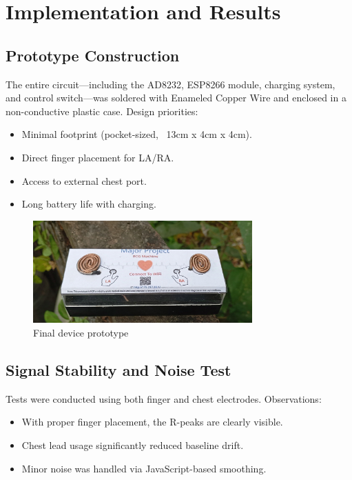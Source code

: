 \chapter{Implementation and Results}

\section{Prototype Construction}
The entire circuit—including the AD8232, ESP8266 module, charging system, and control switch—was soldered with Enameled Copper Wire and enclosed in a non-conductive plastic case. Design priorities:
\begin{itemize}
    \item Minimal footprint (pocket-sized, ~13cm x 4cm x 4cm).
    \item Direct finger placement for LA/RA.
    \item Access to external chest port.
    \item Long battery life with charging.
\end{itemize}

\begin{figure}[h]
    \centering
    \includegraphics[width=0.75\textwidth]{images/proto.jpg}
    \caption{Final device prototype}
\end{figure}


\section{Signal Stability and Noise Test}
Tests were conducted using both finger and chest electrodes. Observations:
\begin{itemize}
    \item With proper finger placement, the R-peaks are clearly visible.
    \item Chest lead usage significantly reduced baseline drift.
    \item Minor noise was handled via JavaScript-based smoothing.
\end{itemize}

